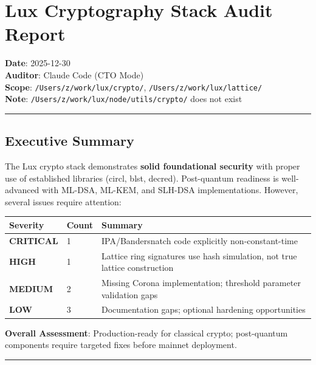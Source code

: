 \documentclass[
]{article}
\author{}
\date{}
\newcounter{none} %
\begin{document}
\section{Lux Cryptography Stack Audit
Report}\label{lux-cryptography-stack-audit-report}

\textbf{Date}: 2025-12-30\\
\textbf{Auditor}: Claude Code (CTO Mode)\\
\textbf{Scope}: \texttt{/Users/z/work/lux/crypto/},
\texttt{/Users/z/work/lux/lattice/}\\
\textbf{Note}: \texttt{/Users/z/work/lux/node/utils/crypto/} does not
exist

\begin{center}\rule{0.5\linewidth}{0.5pt}\end{center}

\subsection{Executive Summary}\label{executive-summary}

The Lux crypto stack demonstrates \textbf{solid foundational security}
with proper use of established libraries (circl, blst, decred).
Post-quantum readiness is well-advanced with ML-DSA, ML-KEM, and SLH-DSA
implementations. However, several issues require attention:

{\def\LTcaptype{none} %
\begin{longtable}[]{@{}lll@{}}
\toprule\noalign{}
Severity & Count & Summary \\
\midrule\noalign{}
\endhead
\bottomrule\noalign{}
\endlastfoot
\textbf{CRITICAL} & 1 & IPA/Bandersnatch code explicitly
non-constant-time \\
\textbf{HIGH} & 1 & Lattice ring signatures use hash simulation, not
true lattice construction \\
\textbf{MEDIUM} & 2 & Missing Corona implementation; threshold
parameter validation gaps \\
\textbf{LOW} & 3 & Documentation gaps; optional hardening
opportunities \\
\end{longtable}
}

\textbf{Overall Assessment}: Production-ready for classical crypto;
post-quantum components require targeted fixes before mainnet
deployment.

\begin{center}\rule{0.5\linewidth}{0.5pt}\end{center}
\end{document}
